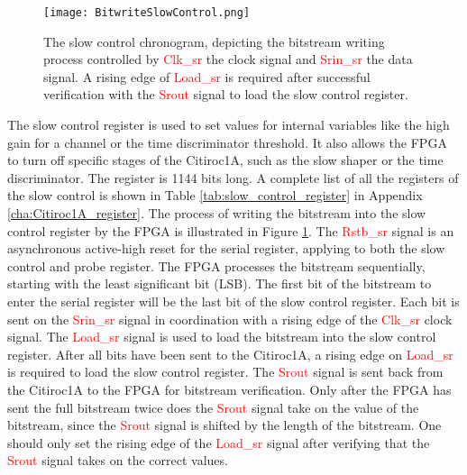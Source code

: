 \begin{figure}
    \centering
    \texttt{[image: BitwriteSlowControl.png]}
    \caption{The slow control chronogram, depicting the bitstream writing process controlled by  \textcolor{red}{Clk\_sr} the clock signal and  \textcolor{red}{Srin\_sr} the data signal. A rising edge of \textcolor{red}{Load\_sr} is required
     after successful verification with the \textcolor{red}{Srout} signal to load the slow control register.\autocite{datasheetCITIROC}}
    \label{fig:CITIROC1A_writing_bitstream}
\end{figure}
The slow control register is used to set values for internal variables like the high gain for a channel or the time discriminator threshold.
It also allows the FPGA to turn off specific stages of the Citiroc1A, such as the slow shaper or the time discriminator.
The register is 1144 bits long. A complete list of all the registers of the slow control is shown in Table \ref{tab:slow_control_register} in Appendix \ref{cha:Citiroc1A_register}.
\newline
The process of writing the bitstream into the slow control register by the FPGA is illustrated in Figure \ref{fig:CITIROC1A_writing_bitstream}.
\newline
The \textcolor{red}{Rstb\_sr} signal is an asynchronous active-high reset for the serial register, applying to both the slow control and probe register. 
\newline
The FPGA processes the bitstream sequentially, starting with the least significant bit (LSB).
The first bit of the bitstream to enter the serial register will be the last bit of the slow control register.
Each bit is sent on the \textcolor{red}{Srin\_sr} signal in coordination with a rising edge of the \textcolor{red}{Clk\_sr} clock signal.
\newline
The \textcolor{red}{Load\_sr} signal is used to load the bitstream into the slow control register. After all bits have been sent to the Citiroc1A,
a rising edge on \textcolor{red}{Load\_sr} is required to load the slow control register.
\newline
The \textcolor{red}{Srout} signal is sent back from the Citiroc1A to the FPGA for bitstream verification.
Only after the FPGA has sent the full bitstream twice does the \textcolor{red}{Srout} signal take on the value of the bitstream, since the \textcolor{red}{Srout} signal is shifted by the length of the bitstream.\autocite{datasheetCITIROC}
One should only set the rising edge of the \textcolor{red}{Load\_sr} signal after verifying that the \textcolor{red}{Srout} signal takes on the correct values.

